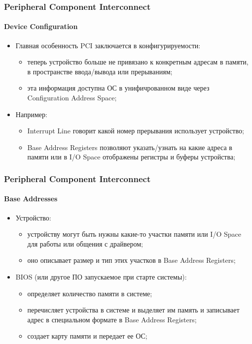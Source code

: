 \begin{frame}
\frametitle{Peripheral Component Interconnect}
\framesubtitle{Device Configuration}
\begin{itemize}
  \item<1-> Главная особенность PCI заключается в конфигурируемости:
    \begin{itemize}
      \item теперь устройство больше не привязано к конкретным адресам в памяти,            в пространстве ввода/вывода или прерываниям;
      \item эта информация доступна ОС в унифичрованном виде через Configuration
            Address Space;
    \end{itemize}
  \item<2-> Например:
    \begin{itemize}
      \item Interrupt Line говорит какой номер прерывания использует устройство;
      \item Base Address Registers позволяют указать/узнать на какие адреса в
            памяти или в I/O Space отображены регистры и буферы устройства;
    \end{itemize}
\end{itemize}
\end{frame}

\begin{frame}
\frametitle{Peripheral Component Interconnect}
\framesubtitle{Base Addresses}
\begin{itemize}
  \item<1-> Устройство:
    \begin{itemize}
      \item устройству могут быть нужны какие-то участки памяти или I/O Space
            для работы или общения с драйвером;
      \item оно описывает размер и тип этих участков в Base Address Registers;
    \end{itemize}
  \item<2-> BIOS (или другое ПО запускаемое при старте системы):
    \begin{itemize}
      \item определяет количество памяти в системе;
      \item перечисляет устройства в системе и выделяет им память и записывает
            адрес в специальном формате в Base Address Registers;
      \item создает карту памяти и передает ее ОС;
    \end{itemize}
\end{itemize}
\end{frame}

